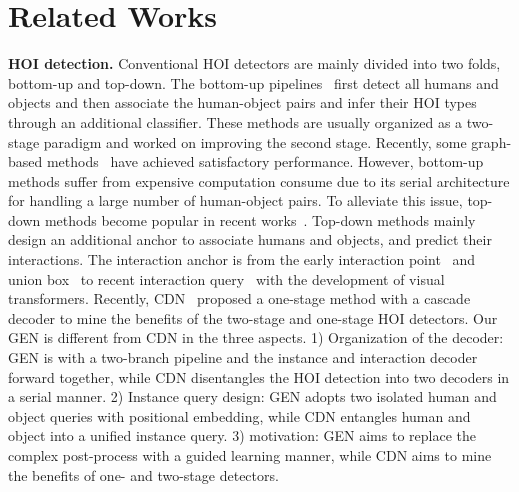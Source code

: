 \documentclass[10pt,twocolumn,letterpaper]{article}
\begin{document}
\vspace{-2mm}\section{Related Works}
\vspace{-1mm}\noindent\textbf{HOI detection.} Conventional HOI detectors are mainly divided into two folds, bottom-up and top-down.
The bottom-up pipelines~\cite{gao2018ican,chao2018learning,li2018transferable,Gupta_2019_ICCV,Zhou_2019_ICCV,Wan_2019_ICCV,li2020detailed,Xu_2019_CVPR,Gao-ECCV-DRG,Liu20a,kim2020detecting,li2021improving} first detect all humans and objects and then associate the human-object pairs and infer their HOI types through an additional classifier. These methods are usually organized as a two-stage paradigm and worked on improving the second stage. Recently, some graph-based methods~\cite{qi2018learning,Ulutan_2020_CVPR,wang2020contextual,YangZ20_IJCAI_In-GraphNet,Zhou_2019_ICCV} have achieved satisfactory performance. However, bottom-up methods suffer from expensive computation consume due to its serial architecture for handling a large number of human-object pairs. 
To alleviate this issue, top-down methods become popular in recent works~\cite{liao2020ppdm,wang2020learning,Kim2020_unidet,zou2021_hoitrans,chen_2021_asnet,tamura2021qpic,Kim_2021_CVPR}. 
Top-down methods mainly design an additional anchor to associate humans and objects, and predict their interactions. The interaction anchor is from the early interaction point~\cite{liao2020ppdm,wang2020learning} and union box~\cite{Kim2020_unidet} to recent interaction query~\cite{chen_2021_asnet,tamura2021qpic,zou2021_hoitrans,Kim_2021_CVPR} with the development of visual transformers. Recently, CDN~\cite{zhang2021mining} proposed a one-stage method with a cascade decoder to mine the benefits of the two-stage and one-stage HOI detectors. Our GEN is different from CDN in the three aspects. 1) Organization of the decoder: GEN is with a two-branch pipeline and the instance and interaction decoder forward together,
while CDN disentangles the HOI detection into two decoders in a serial manner. 2) Instance query design: GEN adopts two isolated human and object queries with positional embedding, while CDN entangles human and object into a unified instance query. 3) motivation: GEN aims to replace the complex post-process with a guided learning manner, while CDN aims to mine the benefits of one- and two-stage detectors.
\end{document}
